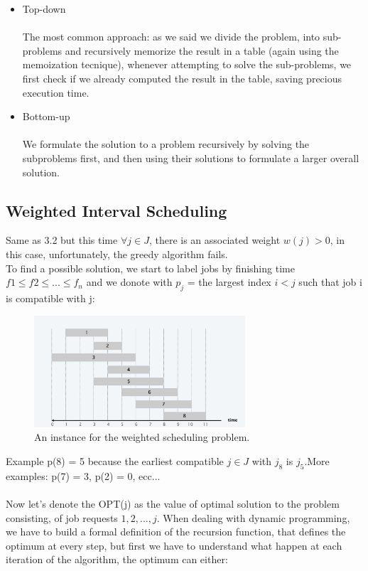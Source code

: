 \documentclass[11pt]{article}
\begin{document}
\begin{itemize}

\item {Top-down}\\\\
The most common approach: as we said we divide the problem, into sub-problems and recursively memorize the result in a table (again using the memoization tecnique), whenever attempting to solve the sub-problems, we first check if we already computed the result in the table, saving precious execution time.

\item {Bottom-up}\\\\
We formulate the solution to a problem recursively by solving the subproblems first, and then using their solutions to formulate a larger overall solution.

\end{itemize}

\subsection{Weighted Interval Scheduling}

Same as 3.2 but this time $\forall j \in J$, there is an associated weight $w(j) > 0$, in this case, unfortunately, the greedy algorithm fails.\\
To find a possible solution, we start to label jobs by finishing time $f1 \leq f2 \leq . . . \leq f_{n}$ and we donote with $p_{j}$ = the largest index $i < j$ such that job i is compatible with j:

\begin{figure}[H]
		\centering
		\includegraphics[width=0.7\textwidth ]{weighted}
		\caption{An instance for the weighted scheduling problem.}
\end{figure}

Example p(8) = 5 because the earliest compatible $j \in J$ with $j_{8}$ is $j_{5}$.More examples: p(7) = 3, p(2) = 0, ecc...\\\\
Now let's denote the OPT(j) as the value of optimal solution to the problem consisting, of job requests $1, 2, ..., j$. When dealing with dynamic programming, we have to build a formal definition of the recursion function, that defines the optimum at every step, but first we have to understand what happen at each iteration of the algorithm, the optimum can either:
\end{document}
